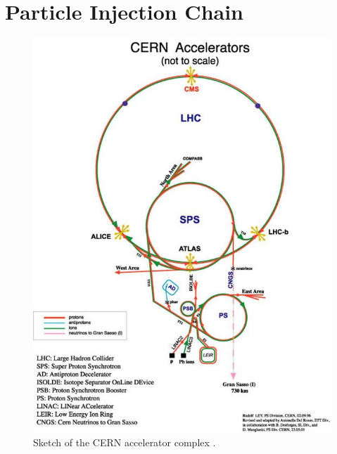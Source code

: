 \section{Particle Injection Chain} \label{sec:lhc:injection}

\begin{figure}[!htbp] 
  \begin{center}
    \includegraphics[width=\linewidth]{figures/lhc/injection.jpg}
    \caption{ Sketch of the  CERN accelerator complex \cite{Haffner:1621894}.} 
    \label{fig:injection_chain} 
  \end{center} 
\end{figure}

